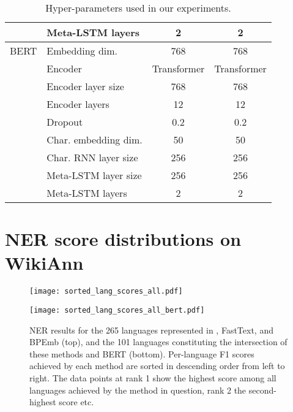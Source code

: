 \documentclass[11pt,a4paper]{article}
\begin{document}
\begin{table}[h!]
\begin{tabular}{l|l|cc}
		 & Meta-LSTM layers & 2 & 2 \\
		\midrule
		BERT & Embedding dim. & 768 & 768 \\
		 & Encoder & Transformer & Transformer \\
		 & Encoder layer size & 768 & 768 \\
		 & Encoder layers & 12 & 12 \\
		 & Dropout & 0.2 & 0.2\\
		 & Char. embedding dim. & 50 & 50 \\
		 & Char. RNN layer size & 256 & 256 \\
		 & Meta-LSTM layer size & 256 & 256 \\
		 & Meta-LSTM layers & 2 & 2 \\
		\bottomrule
	\end{tabular}
	\caption{Hyper-parameters used in our experiments.}
	\label{tbl:hyper-params}
\end{table}

\onecolumn
\section{NER score distributions on WikiAnn}
\label{sec:score-distributions}
\begin{figure}[h!]
	\centering
	\texttt{[image: sorted\_lang\_scores\_all.pdf]}

	\texttt{[image: sorted\_lang\_scores\_all\_bert.pdf]}
	\caption{NER results for the 265 languages represented in \citet{pan2017crosslingual}, FastText, and BPEmb (top), and the 101 languages constituting the intersection of these methods and BERT (bottom).
		Per-language F1 scores achieved by each method are sorted in descending order from left to right.
		The data points at rank 1 show the highest score among all languages achieved by the method in question, rank 2 the second-highest score etc.}
	\label{fig:sorted-lang-scores-all}
\end{figure}

\onecolumn
\newpage
\end{document}
